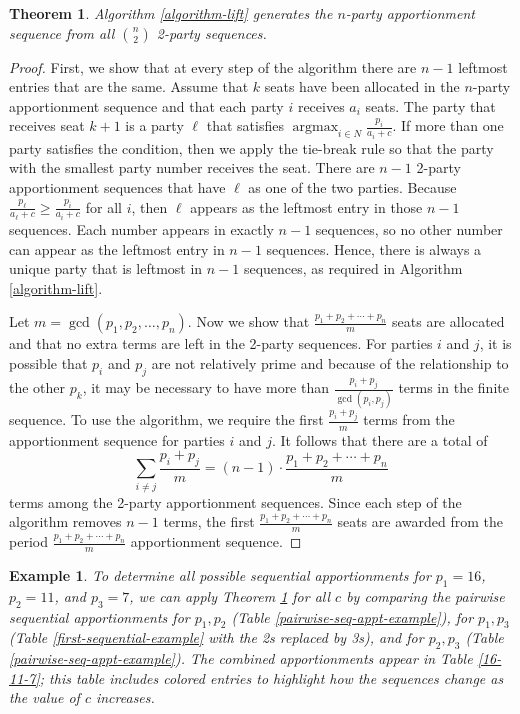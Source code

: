 \documentclass[pdflatex,sn-mathphys-num]{sn-jnl}
\DeclareMathOperator*{\argmax}{argmax}
\theoremstyle{thmstyleone}%
\newtheorem{theorem}{Theorem}%
\theoremstyle{thmstyletwo}%
\newtheorem{example}{Example}%
\theoremstyle{thmstylethree}%
\begin{document}
\begin{theorem} \label{lifting} 
Algorithm \ref{algorithm-lift} generates the $n$-party apportionment sequence from all $\binom{n}{2}$ 2-party sequences.
\end{theorem}
\begin{proof}
First, we show that at every step of the algorithm there are $n-1$ leftmost entries that are the same.  Assume that $k$ seats have been allocated in the $n$-party apportionment sequence and that each party $i$ receives $a_i$ seats.  The party that receives seat $k+1$ is a party $\ell$ that satisfies $\argmax_{i\in N} \frac{p_i}{a_i+c}$.  If more than one party satisfies the condition, then we apply the tie-break rule so that the party with the smallest party number receives the seat. There are $n-1$ 2-party apportionment sequences that have $\ell$ as one of the two parties.  Because $\frac{p_\ell}{a_\ell+c} \ge \frac{p_i}{a_i+c}$ for all $i$, then $\ell$ appears as the leftmost entry in those $n-1$ sequences. Each number appears in exactly $n-1$ sequences, so no other number can appear as the leftmost entry in $n-1$ sequences. Hence, there is always a unique party that is leftmost in $n-1$ sequences, as required in Algorithm \ref{algorithm-lift}. 

Let $m = \gcd(p_1, p_2, \ldots, p_n)$.  Now we show that $\frac{p_1 + p_2 + \cdots + p_n}{m}$ seats are allocated and that no extra terms are left in the 2-party sequences.  
For parties $i$ and $j$, it is possible that $p_i$ and $p_j$ are not relatively prime and because of the relationship to the other $p_k$, it may be necessary to have more than $\frac{p_i+p_j}{\gcd(p_i,p_j)}$ terms in the finite sequence.  To use the algorithm, we require the first $\frac{p_i + p_j}{m}$ terms from the apportionment sequence for parties $i$ and $j$. It follows that there are a total of 
$$\sum_{i \ne j} \frac{p_i + p_j}{m} = (n-1) \cdot \frac{p_1 + p_2 + \cdots + p_n}{m} $$
terms among the 2-party apportionment sequences.  Since each step of the algorithm removes $n-1$ terms, the first $\frac{p_1 + p_2 + \cdots + p_n}{m}$ seats are awarded from the period $\frac{p_1 + p_2 + \cdots + p_n}{m}$ apportionment sequence.  \end{proof}


\begin{example} \label{16_11_7}To determine all possible sequential apportionments for $p_1 = 16$, $p_2 = 11$, and $p_3 = 7$, we can apply Theorem \ref{lifting} for all $c$ by comparing the pairwise sequential apportionments for $p_1, p_2$ (Table \ref{pairwise-seq-appt-example}), for $p_1, p_3$ (Table \ref{first-sequential-example} with the 2s replaced by 3s), and for $p_2, p_3$ (Table \ref{pairwise-seq-appt-example}).  The combined apportionments appear in Table \ref{16-11-7}; this table includes colored entries to highlight how the sequences change as the value of $c$ increases. \end{example}
\end{document}
